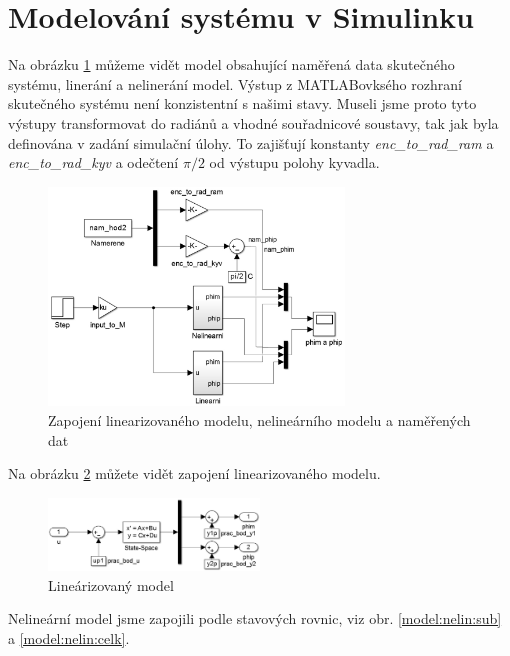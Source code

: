 \documentclass[11pt,a4paper]{article}
\begin{document}
\section{Modelování systému v Simulinku}
Na obrázku \ref{model:celk} můžeme vidět model obsahující naměřená data skutečného systému, linerání a nelinerání model. Výstup z MATLABovksého rozhraní skutečného systému není konzistentní s našimi stavy. Museli jsme proto tyto výstupy transformovat do radiánů a vhodné souřadnicové soustavy, tak jak byla definována v zadání simulační úlohy. To zajišťují konstanty \textit{enc{\_}to{\_}rad{\_}ram} a \textit{enc{\_}to{\_}rad{\_}kyv} a odečtení $\pi/2$ od výstupu polohy kyvadla. 

\begin{figure}[H]
\centering
\includegraphics[width=0.7\textwidth]{schema_celku.jpg}
\caption{Zapojení linearizovaného modelu, nelineárního modelu a naměřených dat}
\label{model:celk}
\end{figure}

Na obrázku \ref{model:lin} můžete vidět zapojení linearizovaného modelu.

\begin{figure}[H]
\centering
\includegraphics[width=0.5\textwidth]{schema_linearizovany.jpg}
\caption{Lineárizovaný model}
\label{model:lin}
\end{figure}

Nelineární model jsme zapojili podle stavových rovnic, viz obr. \ref{model:nelin:sub} a \ref{model:nelin:celk}.
\end{document}
